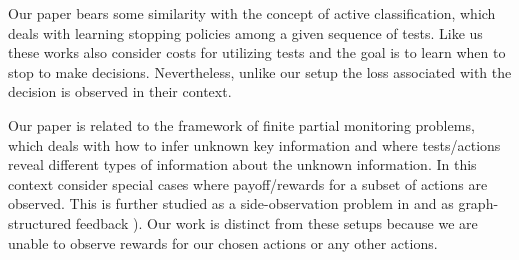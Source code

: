 Our paper bears some similarity with the concept of active classification, which deals with learning stopping policies\cite{poczos2009,ActiveClass-AIJ-s} among a given sequence of tests. Like us these works also consider costs for utilizing tests and the goal is to learn when to stop to make decisions. Nevertheless, unlike our setup the loss associated with the decision is observed in their context. %
%
%
%
%

Our paper is related to the framework of finite partial monitoring problems\cite{BaFoPaRaSze14}, which deals with how to infer unknown key information and where tests/actions reveal different types of information about the unknown information. In this context 
\cite{AgTeAn89:pmon} consider special cases where payoff/rewards for a subset of actions are observed. This is further studied as a side-observation problem in \cite{MaSh11} and as graph-structured feedback \cite{COLT15_OnlineLearningWithFeedback_AlonBianchiDekel, NIPS13_FromBanditsToExperts_AlonBianchiGentile,WGySz:NIPS15}). Our work is distinct from these setups because we are unable to observe rewards for our chosen actions or any other actions.
\vspace{-10pt}

